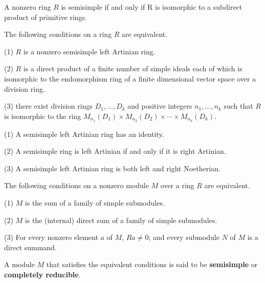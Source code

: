 \begin{theorem}
    A nonzero ring $R$ is semisimple if and only if R is isomorphic to a subdirect product of primitive rings.
\end{theorem}
\begin{theorem}
    The following conditions on a ring $R$ are equivalent.

    (1) $R$ is a nonzero semisimple left Artinian ring.

    (2) $R$ is a direct product of a finite number of simple ideals each of which is isomorphic to the endomorphism ring of a finite dimensional vector space over a division ring.

    (3) there exist division rings $D_1, \ldots, D_k$ and positive integers $n_1, \ldots, n_k$ such that $R$ is isomorphic to the ring $M_{n_1} \left(D_1\right) \times M_{n_2} \left(D_2\right) \times \cdots \times M_{n_k} \left(D_{k}\right)$.
\end{theorem}

\begin{corollary}

    (1) A semisimple left Artinian ring has an identity.

    (2) A semisimple ring is left Artinian if and only if it is right Artinian.

    (3) A semisimple left Artinian ring is both left and right Noetherian.
\end{corollary}

\begin{theorem}
    The following conditions on a nonzero module $M$ over a ring $R$ are equivalent.

    (1) $M$ is the sum of a family of simple submodules.

    (2) $M$ is the (internal) direct sum of a family of simple submodules.

    (3) For every nonzero element $a$ of $M$, $ Ra \neq 0$; and every submodule $N$ of $M$ is a direct summand.

    A module $M$ that satisfies the equivalent conditions is said to be \textbf{semisimple} or \textbf{completely reducible}.
\end{theorem}


